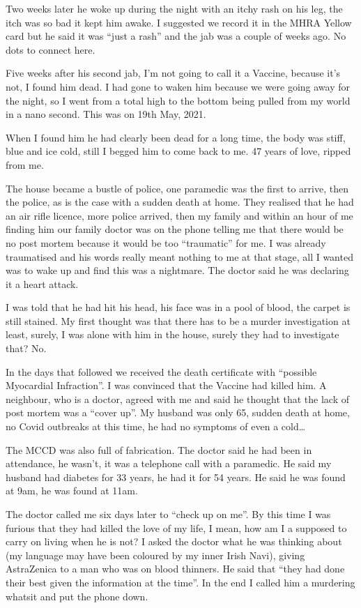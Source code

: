 {Two weeks later he woke up during the night with an itchy rash on his leg, the itch was so bad it kept him awake. I suggested we record it in the MHRA Yellow card but he said it was “just a rash” and the jab was a couple of weeks ago. No dots to connect here.

Five weeks after his second jab, I’m not going to call it a Vaccine, because it’s not, I found him dead. I had gone to waken him because we were going away for the night, so I went from a total high to the bottom being pulled from my world in a nano second. This was on 19th May, 2021.

When I found him he had clearly been dead for a long time, the body was stiff, blue and ice cold, still I begged him to come back to me. 47 years of love, ripped from me.

The house became a bustle of police, one paramedic was the first to arrive, then the police, as is the case with a sudden death at home. They realised that he had an air rifle licence, more police arrived, then my family and within an hour of me finding him our family doctor was on the phone telling me that there would be no post mortem because it would be too “traumatic” for me. I was already traumatised and his words really meant nothing to me at that stage, all I wanted was to wake up and find this was a nightmare. The doctor said he was declaring it a heart attack.

I was told that he had hit his head, his face was in a pool of blood, the carpet is still stained. My first thought was that there has to be a murder investigation at least, surely, I was alone with him in the house, surely they had to investigate that? No.

In the days that followed we received the death certificate with “possible Myocardial Infraction”. I was convinced that the Vaccine had killed him. A neighbour, who is a doctor, agreed with me and said he thought that the lack of post mortem was a “cover up”. My husband was only 65, sudden death at home, no Covid outbreaks at this time, he had no symptoms of even a cold…

The MCCD was also full of fabrication. The doctor said he had been in attendance, he wasn’t, it was a telephone call with a paramedic. He said my husband had diabetes for 33 years, he had it for 54 years. He said he was found at 9am, he was found at 11am.

The doctor called me six days later to “check up on me”. By this time I was furious that they had killed the love of my life, I mean, how am I a supposed to carry on living when he is not? I asked the doctor what he was thinking about (my language may have been coloured by my inner Irish Navi), giving AstraZenica to a man who was on blood thinners. He said that “they had done their best given the information at the time”. In the end I called him a murdering whatsit and put the phone down.

}
